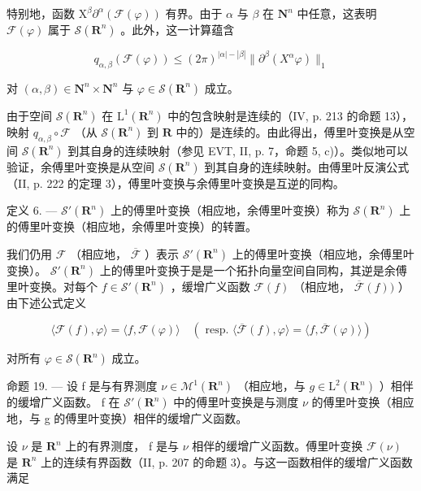 特别地，函数 \(\mathrm{X}^{\beta}\partial^{\alpha}(\mathcal{F}(\varphi))\) 有界。由于 \(\alpha\) 与 \(\beta\) 在 \(\mathbf{N}^{n}\) 中任意，这表明 \(\mathcal{F}(\varphi)\) 属于 \(\mathcal{S}(\mathbf{R}^{n})\) 。此外，这一计算蕴含

\[
q _ {\alpha , \beta} (\mathcal {F} (\varphi)) \leqslant (2 \pi) ^ {| \alpha | - | \beta |} \| \partial^ {\beta} (X ^ {\alpha} \varphi) \| _ {1}
\]

对 \((\alpha, \beta) \in \mathbf{N}^n \times \mathbf{N}^n\) 与 \(\varphi \in \mathcal{S}(\mathbf{R}^n)\) 成立。

由于空间 \(\mathcal{S}(\mathbf{R}^{n})\) 在 \(\mathrm{L}^{1}(\mathbf{R}^{n})\) 中的包含映射是连续的（IV, p. 213 的命题 13），映射 \(q_{\alpha,\beta} \circ \mathcal{F}\) （从 \(\mathcal{S}(\mathbf{R}^{n})\) 到 \(\mathbf{R}\) 中的）是连续的。由此得出，傅里叶变换是从空间 \(\mathcal{S}(\mathbf{R}^{n})\) 到其自身的连续映射（参见 EVT, II, p. 7，命题 5, c)）。类似地可以验证，余傅里叶变换是从空间 \(\mathcal{S}(\mathbf{R}^{n})\) 到其自身的连续映射。由傅里叶反演公式（II, p. 222 的定理 3），傅里叶变换与余傅里叶变换是互逆的同构。

定义 6. --- \(\mathcal{S}'(\mathbf{R}^n)\) 上的傅里叶变换（相应地，余傅里叶变换）称为 \(\mathcal{S}(\mathbf{R}^n)\) 上的傅里叶变换（相应地，余傅里叶变换）的转置。

我们仍用 \(\mathcal{F}\) （相应地， \(\overline{\mathcal{F}}\) ）表示 \(\mathcal{S}'(\mathbf{R}^n)\) 上的傅里叶变换（相应地，余傅里叶变换）。 \(\mathcal{S}'(\mathbf{R}^n)\) 上的傅里叶变换于是是一个拓扑向量空间自同构，其逆是余傅里叶变换。对每个 \(f \in \mathcal{S}'(\mathbf{R}^n)\) ，缓增广义函数 \(\mathcal{F}(f)\) （相应地， \(\overline{\mathcal{F}}(f) )\) ）由下述公式定义

\[
\langle \mathcal {F} (f), \varphi \rangle = \langle f, \mathcal {F} (\varphi) \rangle \quad (\text { resp. } \langle \overline {{\mathcal {F}}} (f), \varphi \rangle = \langle f, \overline {{\mathcal {F}}} (\varphi) \rangle)
\]

对所有 \(\varphi\in\mathcal{S}(\mathbf{R}^{n})\) 成立。

命题 19. --- 设 f 是与有界测度 \(\nu \in \mathcal{M}^{1}(\mathbf{R}^{n})\) （相应地，与 \(g \in \mathrm{L}^{2}(\mathbf{R}^{n})\) ）相伴的缓增广义函数。 f 在 \(\mathcal{S}'(\mathbf{R}^{n})\) 中的傅里叶变换是与测度 \(\nu\) 的傅里叶变换（相应地，与 g 的傅里叶变换）相伴的缓增广义函数。

设 \(\nu\) 是 \(\mathbf{R}^{n}\) 上的有界测度， f 是与 \(\nu\) 相伴的缓增广义函数。傅里叶变换 \(\mathcal{F}(\nu)\) 是 \(\mathbf{R}^{n}\) 上的连续有界函数（II, p. 207 的命题 3）。与这一函数相伴的缓增广义函数满足

